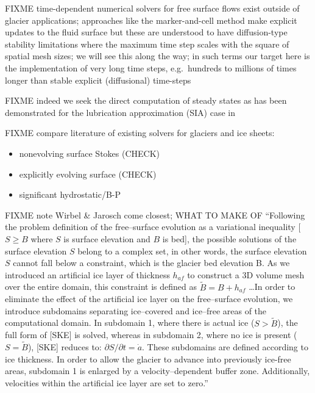 \documentclass[letterpaper,final,12pt,reqno]{amsart}
\begin{document}
FIXME time-dependent numerical solvers for free surface flows exist outside of glacier applications; approaches like the marker-and-cell method \cite{HarlowWelch1965} make explicit updates to the fluid surface but these are understood to have diffusion-type stability limitations where the maximum time step scales with the square of spatial mesh sizes; we will see this along the way; in such terms our target here is the implementation of very long time steps, e.g.~hundreds to millions of times longer than stable explicit (diffusional) time-steps

FIXME indeed we seek the direct computation of steady states as has been demonstrated for the lubrication approximation (SIA) case in \cite{Bueler2016}

FIXME compare literature of existing solvers for glaciers and ice sheets:
\begin{itemize}
\item  nonevolving surface Stokes \cite{IsaacStadlerGhattas2015,Lengetal2013,Lengetal2014a,Zwingeretal2007} (CHECK)
\item  explicitly evolving surface \cite{Gudmundsson1999,HelanowAhlkrona2018,Jouvetetal2008,Larouretal2012,LeMeuretal2004,
Lengetal2014b,Lengetal2012,LeysingerGudmundsson2004,PralongFunk2004,Seddiketal2012,
ZwingerMoore2009} (CHECK)
\item significant hydrostatic/B-P \cite{BrownSmithAhmadia2013,Tuminaroetal2016}
\end{itemize}

FIXME note Wirbel \& Jarosch \cite{WirbelJarosch2020} come closest; WHAT TO MAKE OF ``Following the problem definition of the free–surface evolution as a variational inequality [$S\ge B$ where $S$ is surface elevation and $B$ is bed], the possible solutions of the surface elevation $S$ belong to a complex set, in other words, the surface elevation $S$ cannot fall below a constraint, which is the glacier bed elevation B.  As we introduced an artificial ice layer of thickness $h_{af}$ to construct a 3D volume mesh over the entire domain, this constraint is defined as $\tilde B = B + h_{af}$ \dots  In order to eliminate the effect of the artificial ice layer on the free–surface evolution, we introduce subdomains separating ice–covered and ice–free areas of the computational domain.  In subdomain 1, where there is actual ice ($S > \tilde B$), the full form of [SKE] is solved, whereas in subdomain 2, where no ice is present ($S = \tilde B$), [SKE] reduces to: $\partial S/\partial t=\dot a$.  These subdomains are defined according to ice thickness.  In order to allow the glacier to advance into previously ice-free areas, subdomain 1 is enlarged by a velocity–dependent buffer zone. Additionally, velocities within the artificial ice layer are set to zero.''
\end{document}
